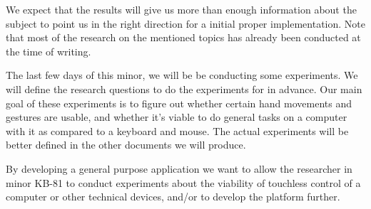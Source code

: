 \documentclass[a4paper]{article}
\begin{document}
We expect that the results will give us more than enough information about the
subject to point us in the right direction for a initial proper implementation.
Note that most of the research on the mentioned topics has already been
conducted at the time of writing.

The last few days of this minor, we will be be conducting some experiments.
We will define the research questions to do the experiments for in advance.
Our main goal of these experiments is to figure out whether certain hand
movements and gestures are usable, and whether it's viable to do general tasks
on a computer with it as compared to a keyboard and mouse.
The actual experiments will be better defined in the other documents we will
produce.

By developing a general purpose application we want to allow the researcher in
minor KB-81 to conduct experiments about the viability of touchless control of
a computer or other technical devices, and/or to develop the platform further.
\end{document}
